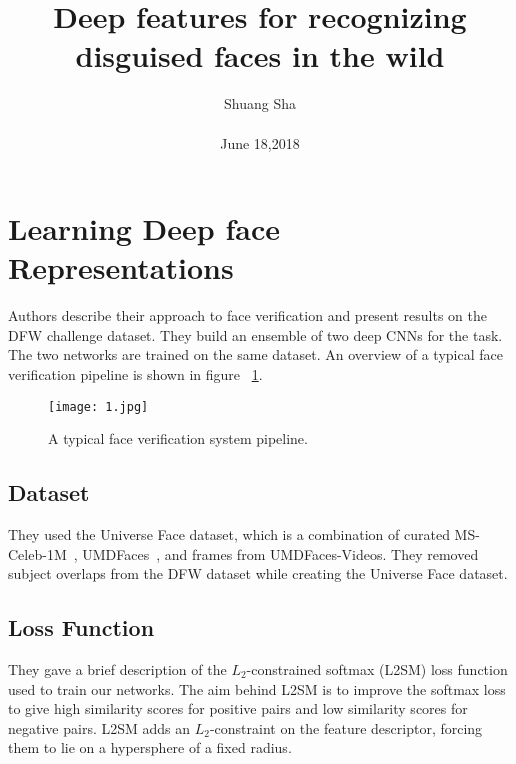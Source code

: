\documentclass[10pt,twocolumn,letterpaper]{article}
\begin{document}
\title{Deep features for recognizing disguised faces in the wild}

\author{Shuang Sha \\\\ June 18,2018}

\maketitle


\section{Learning Deep face Representations}

Authors describe their approach to face verification and present results on the DFW challenge dataset. They build an ensemble of two deep CNNs for the task. The two networks are trained on the same dataset. An overview of a typical face verification pipeline is shown in figure ~\ref{fig:onecol}.

\begin{figure}[!htpb]
\begin{center}
   \texttt{[image: 1.jpg]}
\end{center}
   \caption{A typical face verification system pipeline.}
\label{fig:onecol}
\end{figure}

\subsection{Dataset}

They used the Universe Face dataset, which is a combination of curated MS-Celeb-1M~\cite{guo2016ms}, UMDFaces~\cite{bansal2017umdfaces}, and frames from UMDFaces-Videos. They removed subject overlaps from the DFW dataset while creating the Universe Face dataset.

\subsection{Loss Function}

They gave a brief description of the $L_2$-constrained softmax (L2SM) loss function used to train our networks. The aim behind L2SM is to improve the softmax loss to give high similarity scores for positive pairs and low similarity scores for negative pairs. L2SM adds an $L_2$-constraint on the feature descriptor, forcing them to lie on a hypersphere of a fixed radius. 
\end{document}
